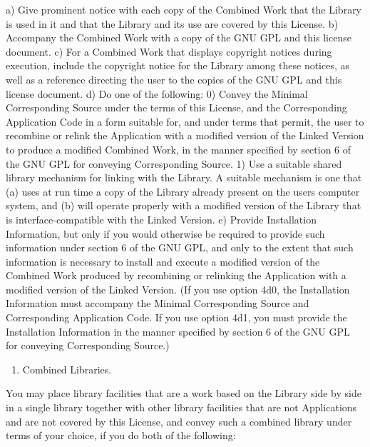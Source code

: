 \documentclass[a4paper,DIV=11
]{scrartcl}
\newcommand{\NormalTok}[1]{#1}
\begin{document}
\NormalTok{a) Give prominent notice with each copy of the Combined Work that the Library is used in it and that the Library and its use are covered by this License.}
\NormalTok{b) Accompany the Combined Work with a copy of the GNU GPL and this license document.}
\NormalTok{c) For a Combined Work that displays copyright notices during execution, include the copyright notice for the Library among these notices, as well as a reference directing the user to the copies of the GNU GPL and this license document.}
\NormalTok{d) Do one of the following:}
\NormalTok{    0) Convey the Minimal Corresponding Source under the terms of this License, and the Corresponding Application Code in a form suitable for, and under terms that permit, the user to recombine or relink the Application with a modified version of the Linked Version to produce a modified Combined Work, in the manner specified by section 6 of the GNU GPL for conveying Corresponding Source.}
\NormalTok{    1) Use a suitable shared library mechanism for linking with the Library. A suitable mechanism is one that (a) uses at run time a copy of the Library already present on the user\textquotesingle{}s computer system, and (b) will operate properly with a modified version of the Library that is interface{-}compatible with the Linked Version.}
\NormalTok{e) Provide Installation Information, but only if you would otherwise be required to provide such information under section 6 of the GNU GPL, and only to the extent that such information is necessary to install and execute a modified version of the Combined Work produced by recombining or relinking the Application with a modified version of the Linked Version. (If you use option 4d0, the Installation Information must accompany the Minimal Corresponding Source and Corresponding Application Code. If you use option 4d1, you must provide the Installation Information in the manner specified by section 6 of the GNU GPL for conveying Corresponding Source.)}


\begin{enumerate}
\def\labelenumi{\arabic{enumi}.}
\item
  Combined Libraries.
\end{enumerate}

You may place library facilities that are a work based on the Library
side by side in a single library together with other library facilities
that are not Applications and are not covered by this License, and
convey such a combined library under terms of your choice, if you do
both of the following:
\end{document}
